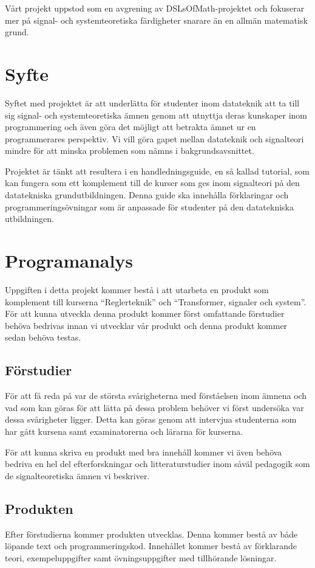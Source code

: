 \documentclass{article}
\begin{document}
Vårt projekt uppstod som en avgrening av DSLsOfMath-projektet och
fokuserar mer på signal- och systemteoretiska färdigheter snarare än
en allmän matematisk grund.

\section{Syfte}
Syftet med projektet är att underlätta för studenter inom datateknik
att ta till sig signal- och systemteoretiska ämnen genom att utnyttja
deras kunskaper inom programmering och även göra det möjligt att
betrakta ämnet ur en programmerares perspektiv.
%
Vi vill göra gapet mellan datateknik och signalteori mindre för att
minska problemen som nämns i bakgrundsavsnittet.

Projektet är tänkt att resultera i en handledningsguide, en så kallad
tutorial, som kan fungera som ett komplement till de kurser som ges
inom signalteori på den datatekniska grundutbildningen.
%
Denna guide ska innehålla förklaringar och programmeringsövningar som
är anpassade för studenter på den datatekniska utbildningen.

\section{Programanalys}
Uppgiften i detta projekt kommer bestå i att utarbeta en produkt som
komplement till kurserna “Reglerteknik” och “Transformer, signaler och
system”.
%
För att kunna utveckla denna produkt kommer först omfattande
förstudier behöva bedrivas innan vi utvecklar vår produkt och denna
produkt kommer sedan behöva testas.

\subsection{Förstudier}
För att få reda på var de största svårigheterna med förståelsen inom
ämnena och vad som kan göras för att lätta på dessa problem behöver vi
först undersöka var dessa svårigheter ligger.
%
Detta kan göras genom att intervjua studenterna som har gått kursena
samt examinatorerna och lärarna för kurserna.

För att kunna skriva en produkt med bra innehåll kommer vi även behöva
bedriva en hel del efterforskningar och litteraturstudier inom såväl
pedagogik som de signalteoretiska ämnen vi beskriver.

\subsection{Produkten}
Efter förstudierna kommer produkten utvecklas.
%
Denna kommer bestå av både löpande text och programmeringskod.
%
Innehållet kommer bestå av förklarande teori, exempeluppgifter samt
övningsuppgifter med tillhörande lösningar.
\end{document}
